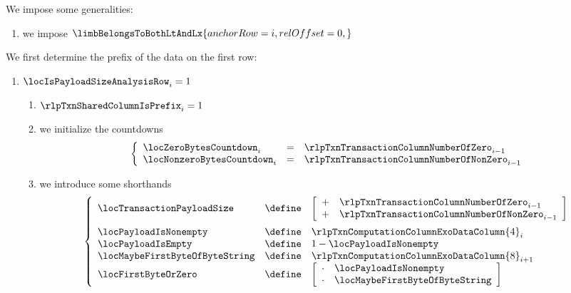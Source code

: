 We impose some generalities:
\begin{enumerate}
	\item we impose
		$\limbBelongsToBothLtAndLx {
			anchorRow = i ,
			relOffset = 0 ,
		}$
\end{enumerate}
We first determine the \rlp{} prefix of the data on the first row:
\begin{enumerate}[resume]
	\item \If $\locIsPayloadSizeAnalysisRow _{i} = 1$ \Then
		\begin{enumerate}
			\item $\rlpTxnSharedColumnIsPrefix _{i} = 1$
			\item we initialize the countdowns
				\[
					\left\{ \begin{array}{lcl}
						\locZeroBytesCountdown    _{i} & = & \rlpTxnTransactionColumnNumberOfZero    _{i - 1} \\
						\locNonzeroBytesCountdown _{i} & = & \rlpTxnTransactionColumnNumberOfNonZero _{i - 1} \\
					\end{array} \right.
				\]
			\item we introduce some shorthands
				\[
					\left\{ \begin{array}{lcl}
						\locTransactionPayloadSize & \define &
						\left[ \begin{array}{cl}
							+ & \rlpTxnTransactionColumnNumberOfZero    _{i - 1} \\
							+ & \rlpTxnTransactionColumnNumberOfNonZero _{i - 1} \\
						\end{array} \right]
						\vspace{2mm}
						\\
						\locPayloadIsNonempty          & \define & \rlpTxnComputationColumnExoDataColumn{4} _{i}      \\
						\locPayloadIsEmpty             & \define & 1 - \locPayloadIsNonempty   \\
						\locMaybeFirstByteOfByteString & \define & \rlpTxnComputationColumnExoDataColumn{8} _{i  + 1} \\
						\locFirstByteOrZero            & \define &
						\left[ \begin{array}{cl}
							\cdot & \locPayloadIsNonempty          \\
							\cdot & \locMaybeFirstByteOfByteString \\
						\end{array} \right]
					\end{array} \right.
\]
\end{enumerate}
\end{enumerate}
